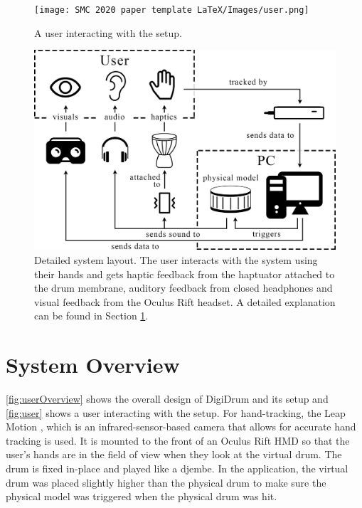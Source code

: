 \documentclass{article}
\begin{document}
\begin{figure}[t]
\texttt{[image: SMC 2020 paper template LaTeX/Images/user.png]}
\caption{A user interacting with the setup.}
\centering
\label{fig:user}
\end{figure}
\begin{figure}[t]
\includegraphics[width=1.0\columnwidth]{Images/systemlayout-updated.png}
\caption{Detailed system layout. The user interacts with the system using their hands and gets haptic feedback from the haptuator attached to the drum membrane, auditory feedback from closed headphones and visual feedback from the Oculus Rift headset. A detailed explanation can be found in Section \ref{sec:sys}.}
\centering
\label{fig:systemLayout}
\end{figure}
\section{System Overview} \label{sec:sys}

\autoref{fig:userOverview} shows the overall design of DigiDrum and its setup and \autoref{fig:user} shows a user interacting with the setup. For hand-tracking, the Leap Motion \cite{leapwebsite}, which is an infrared-sensor-based camera that allows for accurate hand tracking is used. It is mounted to the front of an Oculus Rift HMD so that the user's hands are in the field of view when they look at the virtual drum. The drum is fixed in-place and played like a djembe. In the application, the virtual drum was placed slightly higher than the physical drum to make sure the physical model was triggered when the physical drum was hit.
\end{document}
